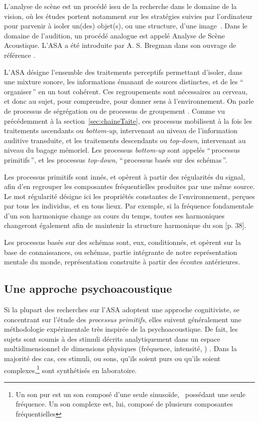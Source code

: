 L'analyse de scène est un procédé issu de la recherche dans le domaine de la vision, où les études portent notamment sur les stratégies suivies par l'ordinateur pour parvenir à isoler un(des) objet(s), ou une structure, d'une image~\citep[p. 12]{mcadams1994penser}. Dans le domaine de l'audition, un procédé analogue est appelé Analyse de Scène Acoustique. L'ASA a été introduite par A. S. Bregman dans son ouvrage de référence \citep{bregman1994auditory}.

L'ASA désigne l'ensemble des traitements perceptifs permettant d'isoler, dans une mixture sonore, les informations émanant de sources distinctes, et de les ``\,organiser\,'' en un tout cohérent. Ces regroupements sont nécessaires au cerveau, et donc au sujet, pour comprendre, pour donner sens à l'environnement. On parle de processus de ségrégation ou de processus de groupement \citep{winkler2009modeling}. Comme vu précédemment à la section~\ref{sec:chaineTaite}, ces processus mobilisent à la fois les traitements ascendants ou \emph{bottom-up}, intervenant au niveau de l'information auditive transduite, et les traitements descendants ou \emph{top-down}, intervenant au niveau du bagage mémoriel. Les processus \emph{bottom-up} sont appelés ``\,processus primitifs\,'', et les processus  \emph{top-down}, ``\,processus basés sur des schémas\,''. 

Les processus primitifs sont innés, et opèrent à partir des régularités du signal, afin d'en regrouper les composantes fréquentielles produites par une même source. Le mot régularité désigne ici les propriétés constantes de l'environnement, perçues par tous les individus, et en tous lieux. Par exemple, si la fréquence fondamentale d'un son harmonique change au cours du temps, toutes ses harmoniques changeront également afin de maintenir la structure harmonique du son [p. 38]\citep{bregman1994auditory}.

Les processus basés sur des schémas sont, eux, conditionnés, et opèrent sur la base de connaissances, ou schémas, partie intégrante de notre représentation mentale du monde, représentation construite à partir des écoutes antérieures. 
 
\subsection{Une approche psychoacoustique}

Si la plupart des recherches sur l'ASA adoptent une approche cognitiviste, se concentrant sur l'étude des \emph{processus primitifs}, elles suivent généralement une méthodologie expérimentale très inspirée de la psychoacoustique. De fait, les sujets sont soumis à des stimuli décrits analytiquement dans un espace multidimensionnel de dimensions physiques (fréquence, intensité, \etc) \citep{dubois2006cognitive}. Dans la majorité des cas, ces stimuli, ou sons, qu'ils soient purs ou qu'ils soient complexes,\footnote{Un son pur est un son composé d'une seule sinusoïde, \ie~possédant une seule fréquence. Un son complexe est, lui, composé de plusieurs composantes fréquentielles} sont synthétisés en laboratoire.

